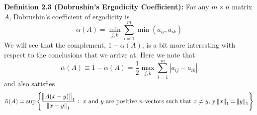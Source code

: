 \noindent\textbf{Definition 2.3 (Dobrushin's Ergodicity Coefficient):} For any $m \times n$ matrix $A$, Dobrushin's coefficient of ergodicity is
\[\alpha(A) = \min_{j, k}\sum_{i = 1}^m \min(a_{ij},a_{ik})\] 
We will see that the complement, $1- \alpha(A)$, is a bit more interesting with respect to the conclusions that we arrive at. Here we note that 
\[\bar{\alpha}(A) \equiv 1 - \alpha(A) = \frac{1}{2} \max_{j,k}\sum_{i = 1}^m|a_{ij} - a_{ik}|\]
and also satisfies
\[\bar{\alpha}(A) = \sup \left\{\frac{\norm{A(x-y)}_1}{\norm{x-y}_1}: \text{ $x$ and $y$ are positive $n$-vectors such that } x\neq y, \, \text{y} \, \norm{x}_1 = \norm{y}_1\right\}\]





